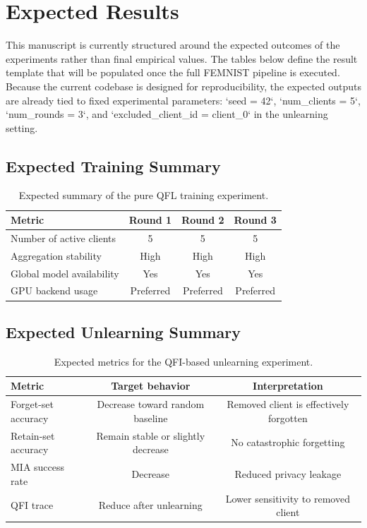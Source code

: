 \section{Expected Results}
\label{sec:results_expected}

This manuscript is currently structured around the expected outcomes of the experiments rather than final empirical values. The tables below define the result template that will be populated once the full FEMNIST pipeline is executed. Because the current codebase is designed for reproducibility, the expected outputs are already tied to fixed experimental parameters: `seed = 42`, `num_clients = 5`, `num_rounds = 3`, and `excluded_client_id = client_0` in the unlearning setting.

\subsection{Expected Training Summary}

\begin{table}[H]
\centering
\caption{Expected summary of the pure QFL training experiment.}
\label{tab:training_expected}
\begin{tabular}{lccc}
\toprule
Metric & Round 1 & Round 2 & Round 3 \\
\midrule
Number of active clients & 5 & 5 & 5 \\
Aggregation stability & High & High & High \\
Global model availability & Yes & Yes & Yes \\
GPU backend usage & Preferred & Preferred & Preferred \\
\bottomrule
\end{tabular}
\end{table}

\subsection{Expected Unlearning Summary}

\begin{table}[H]
\centering
\caption{Expected metrics for the QFI-based unlearning experiment.}
\label{tab:unlearning_expected}
\begin{tabular}{lcc}
\toprule
Metric & Target behavior & Interpretation \\
\midrule
Forget-set accuracy & Decrease toward random baseline & Removed client is effectively forgotten \\
Retain-set accuracy & Remain stable or slightly decrease & No catastrophic forgetting \\
MIA success rate & Decrease & Reduced privacy leakage \\
QFI trace & Reduce after unlearning & Lower sensitivity to removed client \\
\bottomrule
\end{tabular}
\end{table}

